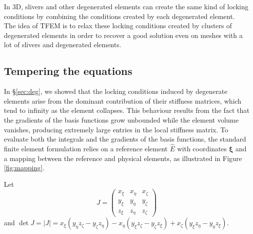 \documentclass{article}
\begin{document}
In 3D, slivers and other degenerated elements can create the same kind of locking conditions by combining the conditions created by each degenerated element.\\
The idea of TFEM is to relax these locking conditions created by clusters of degenerated elements in order to recover a good solution even on meshes with a lot of slivers and degenerated elements.
\fi

\subsection{Tempering the equations}
In \S\ref{sec:deg}, we showed that the locking conditions induced by degenerate elements arise from the dominant contribution of their stiffness matrices, which tend to infinity as the element collapses. This behaviour results from the fact that the gradients of the basis functions grow unbounded while the element volume vanishes, producing extremely large entries in the local stiffness matrix. To evaluate both the integrals and the gradients of the basis functions, the standard finite element formulation relies on a reference element $\hat{E}$ with coordinates $\bm{\xi}$ and a mapping between the reference and physical elements, as illustrated in Figure \ref{fig:mapping}.

Let
$$
J =
\begin{pmatrix}
x_\xi & x_\eta & x_\zeta \\
y_\xi & y_\eta & y_\zeta \\
z_\xi & z_\eta & z_\zeta
\end{pmatrix}$$ and 
$\det J = |J| =
x_\xi (y_\eta z_\zeta - y_\zeta z_\eta)
- x_\eta (y_\xi z_\zeta - y_\zeta z_\xi)
+ x_\zeta (y_\xi z_\eta - y_\eta z_\xi).
$
\end{document}
